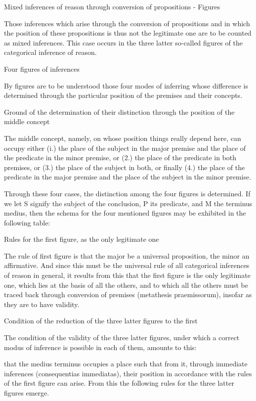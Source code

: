 Mixed inferences of reason through conversion of
propositions - Figures

Those inferences which arise through the conversion of propositions
and in which the position of these propositions is thus
not the legitimate one
are to be counted as mixed inferences.
This case occurs in the three latter so-called
figures of the categorical inference of reason.

Four figures of inferences

By figures are to be understood those four modes of inferring whose
difference is determined through the particular position of the premises
and their concepts.

Ground of the determination of their distinction
through the position of the middle concept

The middle concept, namely,
on whose position things really depend here,
can occupy either
(i.)    the place of the subject in the major premise
        and the place of the predicate in the minor premise, or
(2.)    the place of the predicate in both premises, or
(3.)    the place of the subject in both, or finally
(4.)    the place of the predicate in the major premise
        and the place of the subject in the minor premise.

Through these four cases,
the distinction among the four figures is determined.
If we let S signify the subject of the conclusion,
P its predicate,
and M the terminus medius,
then the schema for the four mentioned figures
may be exhibited in the following table:

Rules for the first figure, as the only legitimate one

The rule of first figure is that
the major be a universal proposition,
the minor an affirmative.
And since this must be the universal rule of
all categorical inferences of reason in general,
it results from this that
the first figure is the only legitimate one,
which lies at the basis of all the others,
and to which all the others must be traced back
through conversion of premises (metathesis praemissorum),
insofar as they are to have validity.

Condition of the reduction of the three latter figures to the first

The condition of the validity of the three latter figures,
under which a correct modus of inference is possible in each of them,
amounts to this:

that the medius terminus occupies a place such that from it,
through immediate inferences (consequentias immediatas),
their position in accordance with the rules of the first figure can arise.
From this the following rules for the three latter figures emerge.

